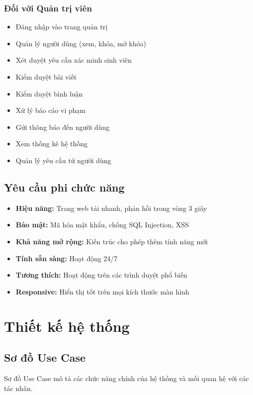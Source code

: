 \documentclass[13pt,a4paper]{extreport}
\begin{document}
\subsubsection{Đối với Quản trị viên}
\begin{itemize}
    \item Đăng nhập vào trang quản trị
    \item Quản lý người dùng (xem, khóa, mở khóa)
    \item Xét duyệt yêu cầu xác minh sinh viên
    \item Kiểm duyệt bài viết
    \item Kiểm duyệt bình luận
    \item Xử lý báo cáo vi phạm
    \item Gửi thông báo đến người dùng
    \item Xem thống kê hệ thống
    \item Quản lý yêu cầu từ người dùng
\end{itemize}

\subsection{Yêu cầu phi chức năng}

\begin{itemize}
    \item \textbf{Hiệu năng:} Trang web tải nhanh, phản hồi trong vòng 3 giây
    \item \textbf{Bảo mật:} Mã hóa mật khẩu, chống SQL Injection, XSS
    \item \textbf{Khả năng mở rộng:} Kiến trúc cho phép thêm tính năng mới
    \item \textbf{Tính sẵn sàng:} Hoạt động 24/7
    \item \textbf{Tương thích:} Hoạt động trên các trình duyệt phổ biến
    \item \textbf{Responsive:} Hiển thị tốt trên mọi kích thước màn hình
\end{itemize}

\section{Thiết kế hệ thống}

\subsection{Sơ đồ Use Case}

Sơ đồ Use Case mô tả các chức năng chính của hệ thống và mối quan hệ với các tác nhân.
\end{document}
